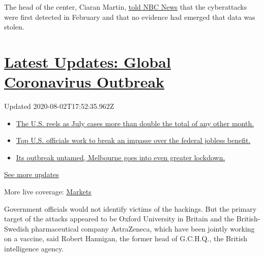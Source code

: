 The head of the center, Ciaran Martin,
\href{https://www.nbcnews.com/news/world/russia-attempting-steal-coronavirus-vaccine-research-u-s-u-k-n1234021}{told
NBC News} that the cyberattacks were first detected in February and that
no evidence had emerged that data was stolen.

\hypertarget{latest-updates-global-coronavirus-outbreak}{%
\section{\texorpdfstring{\href{https://www.nytimes.com/2020/08/01/world/coronavirus-covid-19.html?action=click\&pgtype=Article\&state=default\&region=MAIN_CONTENT_1\&context=storylines_live_updates}{Latest
Updates: Global Coronavirus
Outbreak}}{Latest Updates: Global Coronavirus Outbreak}}\label{latest-updates-global-coronavirus-outbreak}}

Updated 2020-08-02T17:52:35.962Z

\begin{itemize}
\tightlist
\item
  \href{https://www.nytimes.com/2020/08/01/world/coronavirus-covid-19.html?action=click\&pgtype=Article\&state=default\&region=MAIN_CONTENT_1\&context=storylines_live_updates\#link-34047410}{The
  U.S. reels as July cases more than double the total of any other
  month.}
\item
  \href{https://www.nytimes.com/2020/08/01/world/coronavirus-covid-19.html?action=click\&pgtype=Article\&state=default\&region=MAIN_CONTENT_1\&context=storylines_live_updates\#link-780ec966}{Top
  U.S. officials work to break an impasse over the federal jobless
  benefit.}
\item
  \href{https://www.nytimes.com/2020/08/01/world/coronavirus-covid-19.html?action=click\&pgtype=Article\&state=default\&region=MAIN_CONTENT_1\&context=storylines_live_updates\#link-2bc8948}{Its
  outbreak untamed, Melbourne goes into even greater lockdown.}
\end{itemize}

\href{https://www.nytimes.com/2020/08/01/world/coronavirus-covid-19.html?action=click\&pgtype=Article\&state=default\&region=MAIN_CONTENT_1\&context=storylines_live_updates}{See
more updates}

More live coverage:
\href{https://www.nytimes.com/live/2020/07/31/business/stock-market-today-coronavirus?action=click\&pgtype=Article\&state=default\&region=MAIN_CONTENT_1\&context=storylines_live_updates}{Markets}

Government officials would not identify victims of the hackings. But the
primary target of the attacks appeared to be Oxford University in
Britain and the British-Swedish pharmaceutical company AstraZeneca,
which have been jointly working on a vaccine, said Robert Hannigan, the
former head of G.C.H.Q., the British intelligence agency.

